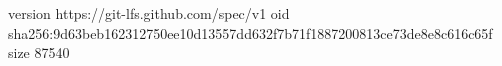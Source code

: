 version https://git-lfs.github.com/spec/v1
oid sha256:9d63beb162312750ee10d13557dd632f7b71f1887200813ce73de8e8c616c65f
size 87540
